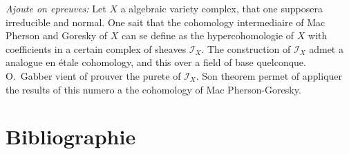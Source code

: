 \documentclass[12pt,a4paper]{article}
\theoremstyle{plain}
\theoremstyle{definition}
\theoremstyle{remark}
\newcommand{\scrI}{\mathscr{I}}
\begin{document}
\vspace{0.5cm}
\noindent\textit{Ajoute on epreuves:} Let $X$ a algebraic variety complex, that one supposera irreducible and normal. One sait that the cohomology intermediaire of Mac Pherson and Goresky of $X$ can se define as the hypercohomologie of $X$ with coefficients in a certain complex of sheaves $\scrI_X$. The construction of $\scrI_X$ admet a analogue en étale cohomology, and this over a field of base quelconque. O.~Gabber vient of prouver the purete of $\scrI_X$. Son theorem permet of appliquer the results of this numero a the cohomology of Mac Pherson-Goresky.


\section*{Bibliographie}
\end{document}
